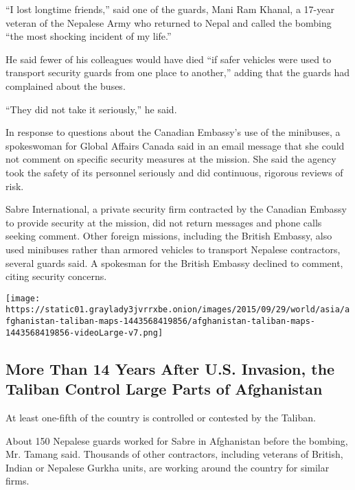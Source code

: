 ``I lost longtime friends,'' said one of the guards, Mani Ram Khanal, a
17-year veteran of the Nepalese Army who returned to Nepal and called
the bombing ``the most shocking incident of my life.''

He said fewer of his colleagues would have died ``if safer vehicles were
used to transport security guards from one place to another,'' adding
that the guards had complained about the buses.

``They did not take it seriously,'' he said.

In response to questions about the Canadian Embassy's use of the
minibuses, a spokeswoman for Global Affairs Canada said in an email
message that she could not comment on specific security measures at the
mission. She said the agency took the safety of its personnel seriously
and did continuous, rigorous reviews of risk.

Sabre International, a private security firm contracted by the Canadian
Embassy to provide security at the mission, did not return messages and
phone calls seeking comment. Other foreign missions, including the
British Embassy, also used minibuses rather than armored vehicles to
transport Nepalese contractors, several guards said. A spokesman for the
British Embassy declined to comment, citing security concerns.

\href{https://www.nytimes3xbfgragh.onion/interactive/2015/09/29/world/asia/afghanistan-taliban-maps.html}{}

\texttt{[image: https://static01.graylady3jvrrxbe.onion/images/2015/09/29/world/asia/afghanistan-taliban-maps-1443568419856/afghanistan-taliban-maps-1443568419856-videoLarge-v7.png]}

\hypertarget{more-than-14-years-after-us-invasion-the-taliban-control-large-parts-of-afghanistan}{%
\subsection{More Than 14 Years After U.S. Invasion, the Taliban Control
Large Parts of
Afghanistan}\label{more-than-14-years-after-us-invasion-the-taliban-control-large-parts-of-afghanistan}}

At least one-fifth of the country is controlled or contested by the
Taliban.

About 150 Nepalese guards worked for Sabre in Afghanistan before the
bombing, Mr. Tamang said. Thousands of other contractors, including
veterans of British, Indian or Nepalese Gurkha units, are working around
the country for similar firms.


